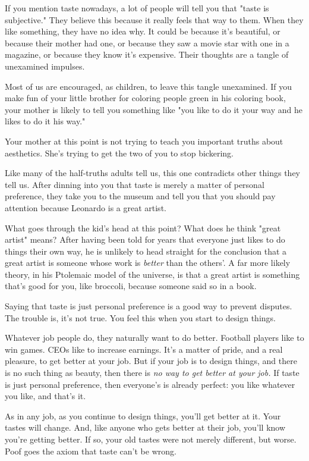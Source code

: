 If you mention taste nowadays, a lot of people will tell
you that "taste is subjective."
They believe this because it really feels that
way to them.  When they like something, they have no idea
why.  It could be because it's beautiful, or because their
mother had one, or because they saw a movie star with one
in a magazine, or because they know it's expensive.
Their thoughts are a tangle of unexamined impulses.

Most of us are encouraged, as children, to leave this tangle
unexamined.  If you make fun of your little brother for
coloring people green in his coloring book, your
mother is likely to tell you something like "you like to
do it your way and he likes to do it his way."

Your mother at this point is not trying to teach you
important truths about aesthetics.  She's trying to get
the two of you to stop bickering.

Like many of the half-truths adults tell us, this one
contradicts other things they tell us.  After dinning
into you that taste is merely a matter of personal preference,
they take you to the museum and tell you that you should
pay attention because Leonardo is a great artist.

What goes through the kid's head at this point?  What does
he think "great artist" means?  After having been
told for years that everyone just likes to do
things their own way, he is
unlikely to head straight for the conclusion that a great
artist is someone whose work is \emph{better} than the others'.
A far more likely theory, in his Ptolemaic model of
the universe, is that a great artist is something that's
good for you, like broccoli, because someone said so in a book.



Saying that taste is just personal preference is a good way
to prevent disputes.  The trouble is, it's not true.
You feel this when you start to design things.

Whatever job people do, they naturally want to do better.
Football players
like to win games.  CEOs like to increase earnings.  It's
a matter of pride, and a real pleasure, to get better at
your job. But if
your job is to design things, and there is no such thing
as beauty, then there is \emph{no way to get better at your job.}
If taste is just personal preference, then everyone's is   
already perfect: you like whatever you like, and that's it.

As in any job, as you continue to design things, you'll get
better at it.  Your tastes will change.  And, like anyone
who gets better at their job, you'll know you're getting
better.  If so,
your old tastes were
not merely different, but worse.  Poof goes the axiom that
taste can't be wrong.

